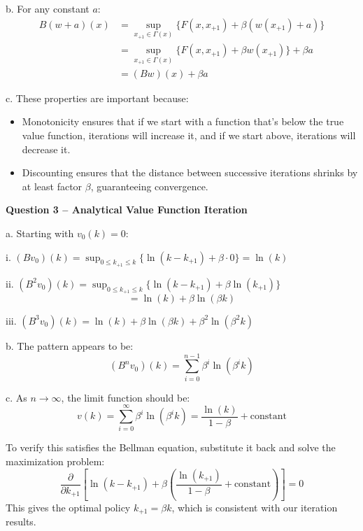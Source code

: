 \documentclass[12pt]{article}
\theoremstyle{definition}
\begin{document}
b. For any constant $a$:
\begin{align*}
B(w + a)(x) &= \sup_{x_{+1} \in \Gamma(x)} \{F(x,x_{+1}) + \beta(w(x_{+1}) + a)\} \\
&= \sup_{x_{+1} \in \Gamma(x)} \{F(x,x_{+1}) + \beta w(x_{+1})\} + \beta a \\
&= (Bw)(x) + \beta a
\end{align*}

c. These properties are important because:
\begin{itemize}
\item Monotonicity ensures that if we start with a function that's below the true value function, iterations will increase it, and if we start above, iterations will decrease it.
\item Discounting ensures that the distance between successive iterations shrinks by at least factor $\beta$, guaranteeing convergence.
\end{itemize}

\vspace{0.5cm}
\noindent\textbf{Question 3 -- Analytical Value Function Iteration}

a. Starting with $v_0(k) = 0$:

i. $(Bv_0)(k) = \sup_{0 \leq k_{+1} \leq k} \{\ln(k - k_{+1}) + \beta \cdot 0\} = \ln(k)$

ii. $(B^2v_0)(k) = \sup_{0 \leq k_{+1} \leq k} \{\ln(k - k_{+1}) + \beta \ln(k_{+1})\}$
\[
= \ln(k) + \beta\ln(\beta k)
\]

iii. $(B^3v_0)(k) = \ln(k) + \beta\ln(\beta k) + \beta^2\ln(\beta^2 k)$

b. The pattern appears to be:
\[
(B^nv_0)(k) = \sum_{i=0}^{n-1} \beta^i \ln(\beta^i k)
\]

c. As $n \to \infty$, the limit function should be:
\[
v(k) = \sum_{i=0}^{\infty} \beta^i \ln(\beta^i k) = \frac{\ln(k)}{1-\beta} + \text{constant}
\]

To verify this satisfies the Bellman equation, substitute it back and solve the maximization problem:
\[
\frac{\partial}{\partial k_{+1}} \left[\ln(k - k_{+1}) + \beta\left(\frac{\ln(k_{+1})}{1-\beta} + \text{constant}\right)\right] = 0
\]
This gives the optimal policy $k_{+1} = \beta k$, which is consistent with our iteration results.
\end{document}
